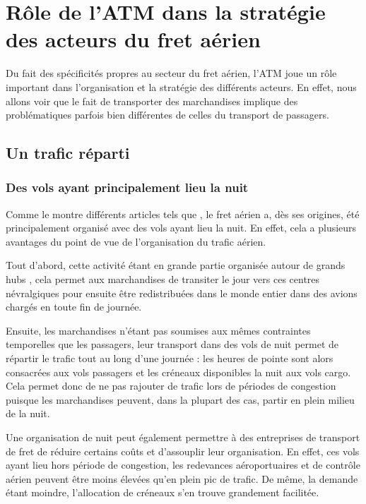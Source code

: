 \section{Rôle de l'ATM dans la stratégie des acteurs du fret aérien}


Du fait des spécificités propres au secteur du fret aérien, l'ATM joue un rôle important dans l'organisation et la stratégie des différents acteurs. En effet, nous allons voir que le fait de transporter des marchandises implique des problématiques parfois bien différentes de celles du transport de passagers.

\subsection{Un trafic réparti}

\subsubsection{Des vols ayant principalement lieu la nuit}

Comme le montre différents articles tels que \cite{popescu}, le fret aérien a, dès ses origines, été principalement organisé avec des vols ayant lieu la nuit. En effet, cela a plusieurs avantages du point de vue de l'organisation du trafic aérien. 

Tout d'abord, cette activité étant en grande partie organisée autour de grands hubs \cite{Walcott201764}, cela permet aux marchandises de transiter le jour vers ces centres névralgiques pour ensuite être redistribuées dans le monde entier dans des avions chargés en toute fin de journée. 

Ensuite, les marchandises n'étant pas soumises aux mêmes contraintes temporelles que les passagers, leur transport dans des vols de nuit permet de répartir le trafic tout au long d'une journée : les heures de pointe sont alors consacrées aux vols passagers et les créneaux disponibles la nuit aux vols cargo. Cela permet donc de ne pas rajouter de trafic lors de périodes de congestion puisque les marchandises peuvent, dans la plupart des cas, partir en plein milieu de la nuit.

Une organisation de nuit peut également permettre à des entreprises de transport de fret de réduire certains coûts et d'assouplir leur organisation. En effet, ces vols ayant lieu hors période de congestion, les redevances aéroportuaires et de contrôle aérien peuvent être moins élevées qu'en plein pic de trafic. De même, la demande étant moindre, l'allocation de créneaux s'en trouve grandement facilitée.

